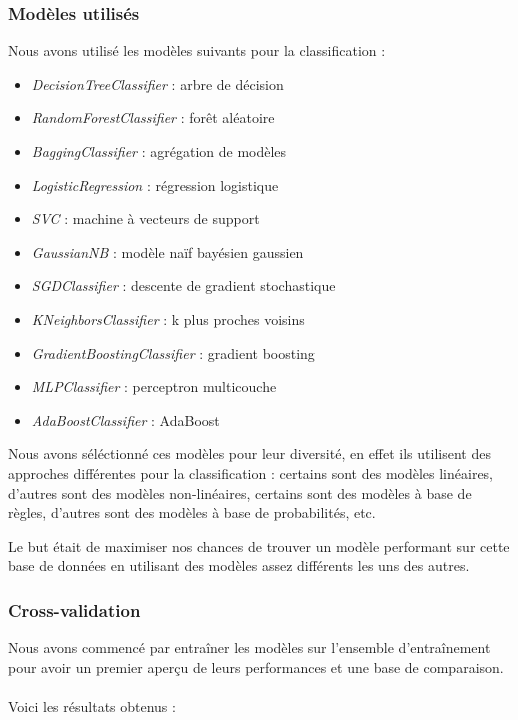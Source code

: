 \documentclass{article}
\begin{document}
\subsubsection{Modèles utilisés}
Nous avons utilisé les modèles suivants pour la classification :
\begin{itemize}
    \item \textit{DecisionTreeClassifier} \cite{DTC} : arbre de décision
    \item \textit{RandomForestClassifier} \cite{RFC} : forêt aléatoire
    \item \textit{BaggingClassifier} \cite{BC} : agrégation de modèles
    \item \textit{LogisticRegression} \cite{LR} : régression logistique
    \item \textit{SVC} \cite{SVC} : machine à vecteurs de support
    \item \textit{GaussianNB} \cite{GNB} : modèle naïf bayésien gaussien
    \item \textit{SGDClassifier} \cite{SGD} : descente de gradient stochastique
    \item \textit{KNeighborsClassifier} \cite{KNN} : k plus proches voisins
    \item \textit{GradientBoostingClassifier} \cite{GNB} : gradient boosting
    \item \textit{MLPClassifier} \cite{MLP} : perceptron multicouche
    \item \textit{AdaBoostClassifier} \cite{ABC} : AdaBoost
\end{itemize}

Nous avons séléctionné ces modèles pour leur diversité, en effet ils utilisent
des approches différentes pour la classification : certains sont des modèles linéaires,
d'autres sont des modèles non-linéaires, certains sont des modèles à base de règles,
d'autres sont des modèles à base de probabilités, etc. 

Le but était de maximiser nos chances de trouver un modèle performant sur cette
base de données en utilisant des modèles assez différents les uns des autres.

\newpage
\subsubsection{Cross-validation}
Nous avons commencé par entraîner les modèles sur l'ensemble d'entraînement pour
avoir un premier aperçu de leurs performances et une base de comparaison.
\\\\
Voici les résultats obtenus :
\end{document}
